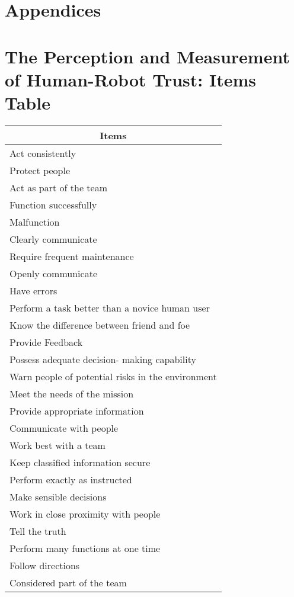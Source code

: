 \section*{Appendices}
\section{The Perception and Measurement of Human-Robot Trust: Items Table}
\label{app:measurement.items.table}	
\begin{longtable}{l}
	\multicolumn{1}{c}{\textbf{Items}} \\ \hline
	\endhead
	Act consistently  \\ \hline
	Protect people \\ \hline
	Act as part of the team \\ \hline
	Function successfully \\ \hline
	Malfunction \\ \hline
	Clearly communicate \\ \hline
	Require frequent maintenance \\ \hline
	Openly communicate \\ \hline
	Have errors \\ \hline
	Perform a task better than a novice human user \\ \hline
	Know the difference between friend and foe \\ \hline
	Provide Feedback \\ \hline
	Possess adequate decision- making capability \\ \hline
	Warn people of potential risks in the environment \\ \hline
	Meet the needs of the mission \\ \hline
	Provide appropriate information \\ \hline
	Communicate with people \\ \hline
	Work best with a team \\ \hline
	Keep classified information secure \\ \hline
	Perform exactly as instructed \\ \hline
	Make sensible decisions \\ \hline
	Work in close proximity with people \\ \hline
	Tell the truth \\ \hline
	Perform many functions at one time \\ \hline
	Follow directions \\ \hline
	Considered part of the team \\ \hline

\end{longtable}
